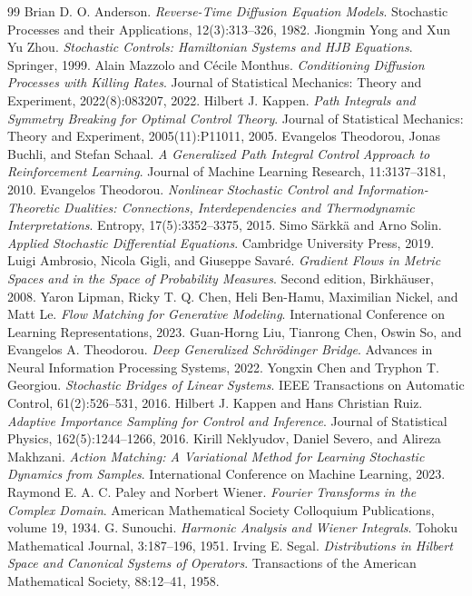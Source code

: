 \begin{thebibliography}{99}
 Brian D. O. Anderson. \emph{Reverse-Time Diffusion Equation Models}. Stochastic Processes and their Applications, 12(3):313--326, 1982.
 Jiongmin Yong and Xun Yu Zhou. \emph{Stochastic Controls: Hamiltonian Systems and HJB Equations}. Springer, 1999.
 Alain Mazzolo and C\'ecile Monthus. \emph{Conditioning Diffusion Processes with Killing Rates}. Journal of Statistical Mechanics: Theory and Experiment, 2022(8):083207, 2022.
 Hilbert J. Kappen. \emph{Path Integrals and Symmetry Breaking for Optimal Control Theory}. Journal of Statistical Mechanics: Theory and Experiment, 2005(11):P11011, 2005.
 Evangelos Theodorou, Jonas Buchli, and Stefan Schaal. \emph{A Generalized Path Integral Control Approach to Reinforcement Learning}. Journal of Machine Learning Research, 11:3137--3181, 2010.
 Evangelos Theodorou. \emph{Nonlinear Stochastic Control and Information-Theoretic Dualities: Connections, Interdependencies and Thermodynamic Interpretations}. Entropy, 17(5):3352--3375, 2015.
 Simo S\"arkk\"a and Arno Solin. \emph{Applied Stochastic Differential Equations}. Cambridge University Press, 2019.
 Luigi Ambrosio, Nicola Gigli, and Giuseppe Savar\'e. \emph{Gradient Flows in Metric Spaces and in the Space of Probability Measures}. Second edition, Birkh\"auser, 2008.
 Yaron Lipman, Ricky T. Q. Chen, Heli Ben-Hamu, Maximilian Nickel, and Matt Le. \emph{Flow Matching for Generative Modeling}. International Conference on Learning Representations, 2023.
 Guan-Horng Liu, Tianrong Chen, Oswin So, and Evangelos A. Theodorou. \emph{Deep Generalized Schr\"odinger Bridge}. Advances in Neural Information Processing Systems, 2022.
 Yongxin Chen and Tryphon T. Georgiou. \emph{Stochastic Bridges of Linear Systems}. IEEE Transactions on Automatic Control, 61(2):526--531, 2016.
 Hilbert J. Kappen and Hans Christian Ruiz. \emph{Adaptive Importance Sampling for Control and Inference}. Journal of Statistical Physics, 162(5):1244--1266, 2016.
 Kirill Neklyudov, Daniel Severo, and Alireza Makhzani. \emph{Action Matching: A Variational Method for Learning Stochastic Dynamics from Samples}. International Conference on Machine Learning, 2023.
 Raymond E. A. C. Paley and Norbert Wiener. \emph{Fourier Transforms in the Complex Domain}. American Mathematical Society Colloquium Publications, volume 19, 1934.
 G. Sunouchi. \emph{Harmonic Analysis and Wiener Integrals}. Tohoku Mathematical Journal, 3:187--196, 1951.
 Irving E. Segal. \emph{Distributions in Hilbert Space and Canonical Systems of Operators}. Transactions of the American Mathematical Society, 88:12--41, 1958.
\end{thebibliography}

